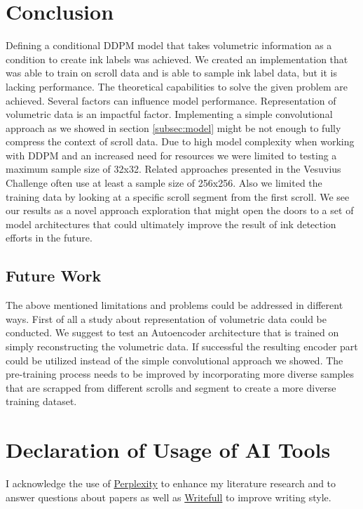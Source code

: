 \documentclass[runningheads]{llncs}
\begin{document}
\section*{Conclusion}
\label{sec:conclusion}
Defining a conditional DDPM model that takes volumetric information as a condition to create ink labels was achieved. We created an implementation that was able to train on scroll data and is able to sample ink label data, but it is lacking performance. The theoretical capabilities to solve the given problem are achieved. Several factors can influence model performance. Representation of volumetric data is an impactful factor. Implementing a simple convolutional approach as we showed in section \ref{subsec:model} might be not enough to fully compress the context of scroll data.
Due to high model complexity when working with DDPM and an increased need for resources we were limited to testing a maximum sample size of 32x32. Related approaches presented in the Vesuvius Challenge \cite{vesuvius} often use at least a sample size of 256x256. Also we limited the training data by looking at a specific scroll segment from the first scroll. We see our results as a novel approach exploration that might open the doors to a set of model architectures that could ultimately improve the result of ink detection efforts in the future.
\subsection*{Future Work}
The above mentioned limitations and problems could be addressed in different ways. First of all a study about representation of volumetric data could be conducted. We suggest to test an Autoencoder architecture that is trained on simply reconstructing the volumetric data. If successful the resulting encoder part could be utilized instead of the simple convolutional approach we showed.
The pre-training process needs to be improved by incorporating more diverse samples that are scrapped from different scrolls and segment to create a more diverse training dataset.
\section*{Declaration of Usage of AI Tools}
I acknowledge the use of \href{https://www.perplexity.ai}{Perplexity} to enhance my literature research and to answer questions about papers as well as \href{https://www.writefull.com/}{Writefull} to improve writing style.


\end{document}
